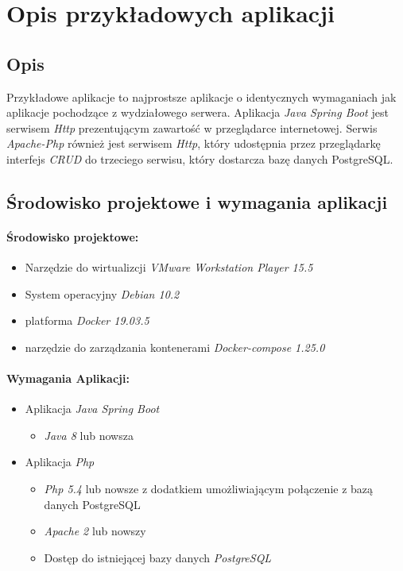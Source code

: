 \documentclass[polish, a4paper, 12pt, oneside]{book}
\begin{document}
	\chapter{Opis przykładowych aplikacji}
	\section{Opis}
	Przykładowe aplikacje to najprostsze aplikacje o identycznych wymaganiach jak aplikacje pochodzące z wydziałowego serwera. Aplikacja \textit{Java Spring Boot} jest  serwisem \textit{Http} prezentującym zawartość w przeglądarce internetowej. Serwis \textit{Apache-Php} również jest serwisem \textit{Http}, który udostępnia przez przeglądarkę interfejs \textit{CRUD} do trzeciego serwisu, który dostarcza bazę danych PostgreSQL.  
	\section{Środowisko projektowe i wymagania aplikacji}
	\subsubsection{Środowisko projektowe:}
	\begin{itemize}[noitemsep]
		\item Narzędzie do wirtualizcji \textit{VMware Workstation Player 15.5}\cite{vmwareplayer}
		\item System operacyjny \textit{Debian 10.2}\cite{debian10}
		\item platforma \textit{Docker 19.03.5}\cite{docker}
		\item narzędzie do zarządzania kontenerami \textit{Docker-compose 1.25.0}\cite{dockercompose}
	\end{itemize}
	
	\subsubsection{Wymagania Aplikacji:}
	\begin{itemize}[noitemsep]
		\item Aplikacja \textit{Java Spring Boot}
		\begin{itemize}[noitemsep]
			\item \textit{Java 8}\cite{java} lub nowsza
		\end{itemize}
		\item Aplikacja \textit{Php}
		\begin{itemize}[noitemsep]
			\item \textit{Php 5.4}\cite{php} lub nowsze z dodatkiem umożliwiającym połączenie z bazą danych PostgreSQL
			\item \textit{Apache 2}\cite{apache} lub nowszy
			\item Dostęp do istniejącej bazy danych \textit{PostgreSQL}\cite{postgresql}
		\end{itemize}
	\end{itemize}
	
\end{document}
